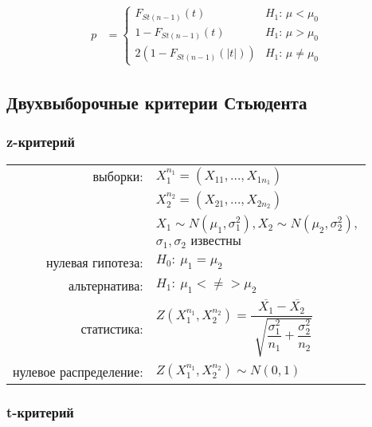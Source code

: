 \documentclass[a4paper,12pt]{article}
\begin{document}
\begin{align*}
p &=
	\begin{cases}
		F_{St(n-1)}(t) & H_{1}\text{: } \mu < \mu_{0} \\
        1-F_{St(n-1)}(t) & H_{1}\text{: } \mu > \mu_{0} \\
		2(1-F_{St(n-1)}(|t|)) & H_{1}\text{: } \mu \neq \mu_{0}
	\end{cases}
\end{align*}
\pagebreak

\subsection{Двухвыборочные критерии Стьюдента}

\subsubsection{z-критерий}

\begin{table}[h]
	\begin{tabular}{rl}
выборки:& $ X^{n_{1}}_{1} = \left( X_{11}, \ldots, X_{1n_{1}} \right) $ \\
       & $ X^{n_{2}}_{2} = \left( X_{21}, \ldots, X_{2n_{2}} \right) $ \\
       & $ X_{1} \sim N( \mu_{1}, \sigma^{2}_{1}), X_{2} \sim N( \mu_{2}, \sigma^{2}_{2}), $ \\
       & $ \sigma_{1},\sigma_{2} \text{ известны} $ \\
нулевая гипотеза: & $ H_{0}:~\mu_{1}=\mu_{2} $ \\
альтернатива: & $ H_{1}:~\mu_{1} <\neq> \mu_{2} $ \\
статистика: & $ Z\left( X^{n_{1}}_{1}, X^{n_{2}}_{2} \right) = \dfrac{\overline{X_{1}}-\overline{X_{2}}}{\sqrt[]{ \dfrac{\sigma_{1}^{2}}{n_{1}} + \dfrac{\sigma_{2}^{2}}{n_{2}} }} $ \\
нулевое распределение: & $ Z\left( X^{n_{1}}_{1}, X^{n_{2}}_{2} \right) \sim N(0, 1) $
	\end{tabular}
\end{table}

\subsubsection{t-критерий}
\end{document}
